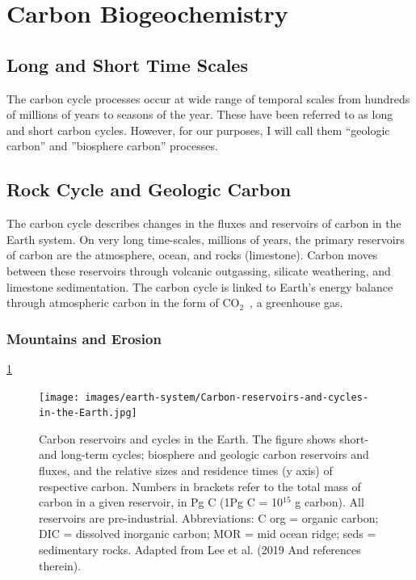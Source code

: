 \documentclass{book}\usepackage{knitr}
\newcommand{\carbondioxide}{CO$_2$~}
\begin{document}
\section{Carbon Biogeochemistry}

\subsection{Long and Short Time Scales}

The carbon cycle processes occur at wide range of temporal scales from hundreds of millions of years to seasons of the year. These have been referred to as long and short carbon cycles. However, for our purposes, I will call them ``geologic carbon'' and ''biosphere carbon'' processes. 

\subsection{Rock Cycle and Geologic Carbon}

The carbon cycle describes changes in the fluxes and reservoirs of carbon in the Earth system. On very long time-scales, millions of years, the primary reservoirs of carbon are the atmosphere, ocean, and rocks (limestone). Carbon moves between these reservoirs through volcanic outgassing, silicate weathering, and limestone sedimentation. The carbon cycle is linked to Earth's energy balance through atmospheric carbon in the form of \carbondioxide, a greenhouse gas.

\subsubsection{Mountains and Erosion}

\ref{fig:carbonpools}

\begin{figure}
\texttt{[image: images/earth-system/Carbon-reservoirs-and-cycles-in-the-Earth.jpg]}
\caption{Carbon reservoirs and cycles in the Earth. The figure shows short-and long-term cycles; biosphere and geologic carbon reservoirs and fluxes, and the relative sizes and residence times (y axis) of respective carbon. Numbers in brackets refer to the total mass of carbon in a given reservoir, in Pg C (1Pg C = 10$^{15}$ g carbon). All reservoirs are pre-industrial. Abbreviations: C org = organic carbon; DIC = dissolved inorganic carbon; MOR = mid ocean ridge; seds = sedimentary rocks. Adapted from Lee et al. (2019 And references therein).}
\label{fig:carbonpools}
\end{figure}
\end{document}
